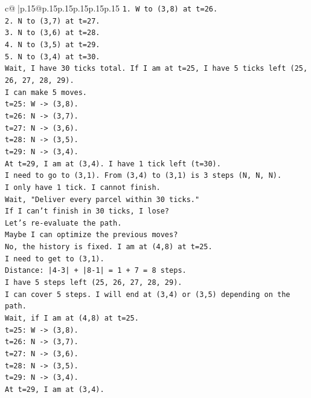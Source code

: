 \documentclass{article}
\begin{document}
{\begin{supertabular}{c@{$\;$}|p{.15\linewidth}@{}p{.15\linewidth}p{.15\linewidth}p{.15\linewidth}p{.15\linewidth}p{.15\linewidth}}
{{{\texttt{1. W to (3,8) at t=26.} \\
\texttt{2. N to (3,7) at t=27.} \\
\texttt{3. N to (3,6) at t=28.} \\
\texttt{4. N to (3,5) at t=29.} \\
\texttt{5. N to (3,4) at t=30.} \\
\texttt{Wait, I have 30 ticks total. If I am at t=25, I have 5 ticks left (25, 26, 27, 28, 29).} \\
\texttt{I can make 5 moves.} \\
\texttt{t=25: W {-}> (3,8).} \\
\texttt{t=26: N {-}> (3,7).} \\
\texttt{t=27: N {-}> (3,6).} \\
\texttt{t=28: N {-}> (3,5).} \\
\texttt{t=29: N {-}> (3,4).} \\
\texttt{At t=29, I am at (3,4). I have 1 tick left (t=30).} \\
\texttt{I need to go to (3,1). From (3,4) to (3,1) is 3 steps (N, N, N).} \\
\texttt{I only have 1 tick. I cannot finish.} \\
\texttt{Wait, "Deliver every parcel within 30 ticks."} \\
\texttt{If I can't finish in 30 ticks, I lose?} \\
\texttt{Let's re{-}evaluate the path.} \\
\texttt{Maybe I can optimize the previous moves?} \\
\texttt{No, the history is fixed. I am at (4,8) at t=25.} \\
\texttt{I need to get to (3,1).} \\
\texttt{Distance: |4{-}3| + |8{-}1| = 1 + 7 = 8 steps.} \\
\texttt{I have 5 steps left (25, 26, 27, 28, 29).} \\
\texttt{I can cover 5 steps. I will end at (3,4) or (3,5) depending on the path.} \\
\texttt{Wait, if I am at (4,8) at t=25.} \\
\texttt{t=25: W {-}> (3,8).} \\
\texttt{t=26: N {-}> (3,7).} \\
\texttt{t=27: N {-}> (3,6).} \\
\texttt{t=28: N {-}> (3,5).} \\
\texttt{t=29: N {-}> (3,4).} \\
\texttt{At t=29, I am at (3,4).} \\
}}}
\end{supertabular}}
\end{document}
